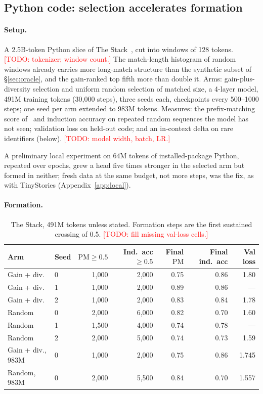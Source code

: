 \documentclass[11pt]{article}
\newcommand{\todo}[1]{\textcolor{red}{[TODO: #1]}}
\newcommand{\pm}{\mathrm{PM}}
\begin{document}
\subsection{Python code: selection accelerates formation}
\label{sec:stack}

\paragraph{Setup.}
A 2.5B-token Python slice of The Stack~\citep{kocetkov2022stack}, cut into
windows of 128 tokens. \todo{tokenizer; window count.} The match-length
histogram of random windows already carries more long-match structure than
the synthetic subset of \S\ref{sec:oracle}, and the gain-ranked top fifth
more than double it. Arms: gain-plus-diversity selection and uniform random
selection of matched size, a 4-layer model, 491M training tokens (30,000
steps), three seeds each, checkpoints every 500--1000 steps; one seed per
arm extended to 983M tokens. Measures: the prefix-matching score
of~\citet{olsson2022induction} and induction accuracy on repeated random
sequences the model has not seen; validation loss on held-out code; and an
in-context delta on rare identifiers (below). \todo{model width, batch,
LR.}

A preliminary local experiment on 64M tokens of installed-package Python,
repeated over epochs, grew a head five times stronger in the selected arm
but formed in neither; fresh data at the same budget, not more steps, was
the fix, as with TinyStories (Appendix~\ref{app:local}).

\paragraph{Formation.}
\begin{table}[t]\centering\small
\begin{tabular}{llrrrrr}\toprule
Arm & Seed & $\pm\geq0.5$ & Ind.\ acc $\geq0.5$ & Final $\pm$ & Final ind.\ acc & Val loss \\\midrule
Gain + div. & 0 & 1,000 & 2,000 & 0.75 & 0.86 & 1.80 \\
Gain + div. & 1 & 1,000 & 2,000 & 0.89 & 0.86 & --- \\
Gain + div. & 2 & 1,000 & 2,000 & 0.83 & 0.84 & 1.78 \\
Random      & 0 & 2,000 & 6,000 & 0.82 & 0.70 & 1.60 \\
Random      & 1 & 1,500 & 4,000 & 0.74 & 0.78 & --- \\
Random      & 2 & 2,000 & 5,000 & 0.74 & 0.73 & 1.59 \\\midrule
Gain + div., 983M & 0 & 1,000 & 2,000 & 0.75 & 0.86 & 1.745 \\
Random, 983M      & 0 & 2,000 & 5,500 & 0.84 & 0.70 & 1.557 \\\bottomrule
\end{tabular}
\caption{The Stack, 491M tokens unless stated. Formation steps are the
first sustained crossing of 0.5. \todo{fill missing val-loss cells.}}
\label{tab:stack}
\end{table}
\end{document}
